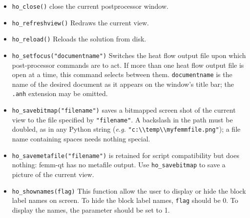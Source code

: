 \begin{itemize}

\item \texttt{ho\_close()} close the current postprocessor window.

\item{\tt ho\_refreshview()} Redraws the current view.

\item{\tt ho\_reload()} Reloads the solution from disk.
\item{\tt ho\_setfocus("documentname")} Switches the heat flow output
file upon which post-processor commands are to act.  If more than one
heat flow output file is open at a time, this command selects between them.
{\tt documentname} is the name of the desired document as it appears on the
window's title bar; the {\tt .anh} extension may be omitted.

\item \texttt{ho\_savebitmap("filename")} saves a bitmapped screen shot of the current
view to the file specified by {\tt "filename"}.  A backslash in the path
must be doubled, as in any Python string ({\em e.g.}
\verb+"c:\\temp\\myfemmfile.png"+); a file name containing spaces needs
nothing special.
\item \texttt{ho\_savemetafile("filename")} is retained for script
compatibility but does nothing: femm-qt has no metafile output. Use
\texttt{ho\_savebitmap} to save a picture of the current view.

\item \texttt{ho\_shownames(flag)} This function allow the user to display or hide the
block label names on screen. To hide the block label names,
\texttt{flag} should be 0. To display the names, the parameter
should be set to 1.



\end{itemize}
